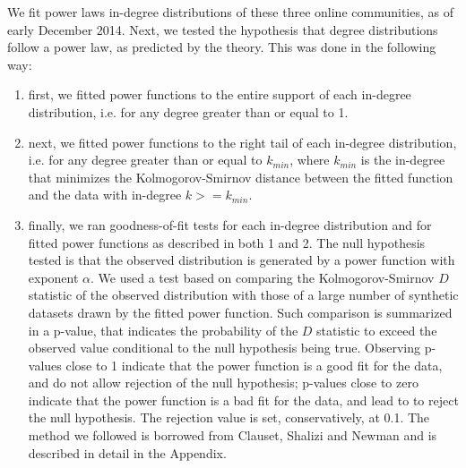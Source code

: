 We fit power laws in-degree distributions of these three online communities, as of early December 2014. Next, we tested the hypothesis that degree distributions follow a power law, as predicted by the theory. This was done in the following way:
\begin{enumerate}
\item first, we fitted power functions to the entire support of each in-degree distribution, i.e. for any degree greater than or equal to 1. 
\item next, we fitted power functions to the right tail of each in-degree distribution, i.e. for any degree greater than or equal to $k_{min}$, where $k_{min}$ is the in-degree that minimizes the Kolmogorov-Smirnov distance between the fitted function and the data with in-degree $k>=k_{min}$.
\item finally, we ran goodness-of-fit tests for each in-degree distribution and for fitted power functions as described in both 1 and 2. The null hypothesis tested is that the observed distribution is generated by a power function with exponent $\alpha$. We used a test based on comparing the Kolmogorov-Smirnov $D$ statistic of the observed distribution with those of a large number of synthetic datasets drawn by the fitted power function. Such comparison is summarized in a p-value, that indicates the probability of the $D$ statistic to exceed the observed value conditional to the null hypothesis being true. Observing p-values close to 1 indicate that the power function is a good fit for the data, and do not allow rejection of the null hypothesis; p-values close to zero indicate that the power function is a bad fit for the data, and lead to to reject the null hypothesis. The rejection value is set, conservatively, at 0.1.  The method we followed is borrowed from Clauset, Shalizi and Newman \cite{clauset2009power} and is described in detail in the Appendix. 
\end{enumerate}

